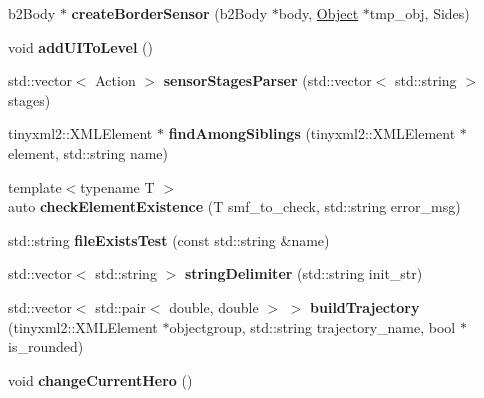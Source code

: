\begin{DoxyCompactItemize}
\item 
\mbox{\label{class_level_a604d7a27a6c6fb3ab631b85e6c063364}} 
b2\+Body $\ast$ {\bfseries create\+Border\+Sensor} (b2\+Body $\ast$body, \hyperlink{class_object}{Object} $\ast$tmp\+\_\+obj, Sides)
\item 
\mbox{\label{class_level_a9977ee08d7036b23eb0467a6d8d2e176}} 
void {\bfseries add\+U\+I\+To\+Level} ()
\item 
\mbox{\label{class_level_ab61118c640a3426f77d88990a4ddc697}} 
std\+::vector$<$ Action $>$ {\bfseries sensor\+Stages\+Parser} (std\+::vector$<$ std\+::string $>$ stages)
\item 
\mbox{\label{class_level_a214fb496aebd1994f8aae99bc5f6eb24}} 
tinyxml2\+::\+X\+M\+L\+Element $\ast$ {\bfseries find\+Among\+Siblings} (tinyxml2\+::\+X\+M\+L\+Element $\ast$element, std\+::string name)
\item 
\mbox{\label{class_level_aa41dee685cdbf78a7b0305b118441945}} 
{\footnotesize template$<$typename T $>$ }\\auto {\bfseries check\+Element\+Existence} (T smf\+\_\+to\+\_\+check, std\+::string error\+\_\+msg)
\item 
\mbox{\label{class_level_a1965bb306d89207706d1e9ac315ffb43}} 
std\+::string {\bfseries file\+Exists\+Test} (const std\+::string \&name)
\item 
\mbox{\label{class_level_a6aecafb8e2e9a33178c9d18d100d7261}} 
std\+::vector$<$ std\+::string $>$ {\bfseries string\+Delimiter} (std\+::string init\+\_\+str)
\item 
\mbox{\label{class_level_ac8bdc4273913a8f0bf8523c6fe20450a}} 
std\+::vector$<$ std\+::pair$<$ double, double $>$ $>$ {\bfseries build\+Trajectory} (tinyxml2\+::\+X\+M\+L\+Element $\ast$objectgroup, std\+::string trajectory\+\_\+name, bool $\ast$is\+\_\+rounded)
\item 
\mbox{\label{class_level_a4d1a3f12d428bf22faa547fa170df275}} 
void {\bfseries change\+Current\+Hero} ()
\item 
\mbox{\label{class_level_ab82d5f8bcf7c4e630d7e166b2a78e3aa}} 

\end{DoxyCompactItemize}

